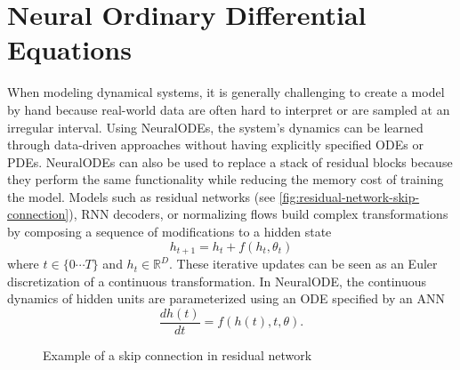 \section{Neural Ordinary Differential Equations}
\label{sec:literature-review-neural-ordinary-differential-equations}

When modeling dynamical systems, it is generally challenging to create a model by hand because real-world data are often hard to interpret or are sampled at an irregular interval.
Using \glspl{NeuralODE}, the system's dynamics can be learned through data-driven approaches without having explicitly specified \glspl{ODE} or \glspl{PDE}.
\glspl{NeuralODE} can also be used to replace a stack of residual blocks because they perform the same functionality while reducing the memory cost of training the model.
Models such as residual networks (see \autoref{fig:residual-network-skip-connection}), \gls{RNN} decoders, or normalizing flows build complex transformations by composing a sequence of modifications to a hidden state \cite{chenNeuralOrdinaryDifferential2019}
\begin{equation}
    h_{t+1} = h_t + f(h_t, \theta_t)
\end{equation}
where $t \in \{0 \cdots T\}$ and $h_t \in \mathbb{R}^D$.
These iterative updates can be seen as an Euler discretization of a continuous transformation.
In \gls{NeuralODE}, the continuous dynamics of hidden units are parameterized using an \gls{ODE} specified by an \gls{ANN} \cite{chenNeuralOrdinaryDifferential2019}
\begin{equation}
    \frac{dh(t)}{dt} = f(h(t), t, \theta).
\end{equation}

\begin{figure}[h]
    \centering
    \caption[ResNet skip connection]{Example of a skip connection in residual network}
    \label{fig:residual-network-skip-connection}
\end{figure}

